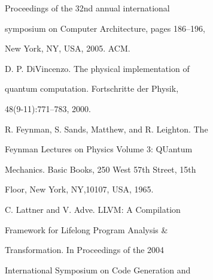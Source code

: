 \documentclass[a4paper,portrait,12pt]{article}
\begin{document}
\begin{flushleft}
Proceedings of the 32nd annual international
\end{flushleft}


\begin{flushleft}
symposium on Computer Architecture, pages 186--196,
\end{flushleft}


\begin{flushleft}
New York, NY, USA, 2005. ACM.
\end{flushleft}


\begin{flushleft}
[2] D. P. DiVincenzo. The physical implementation of
\end{flushleft}


\begin{flushleft}
quantum computation. Fortschritte der Physik,
\end{flushleft}


48(9-11):771--783, 2000.


\begin{flushleft}
[3] R. Feynman, S. Sands, Matthew, and R. Leighton. The
\end{flushleft}


\begin{flushleft}
Feynman Lectures on Physics Volume 3: QUantum
\end{flushleft}


\begin{flushleft}
Mechanics. Basic Books, 250 West 57th Street, 15th
\end{flushleft}


\begin{flushleft}
Floor, New York, NY,10107, USA, 1965.
\end{flushleft}


\begin{flushleft}
[4] C. Lattner and V. Adve. LLVM: A Compilation
\end{flushleft}


\begin{flushleft}
Framework for Lifelong Program Analysis \&
\end{flushleft}


\begin{flushleft}
Transformation. In Proceedings of the 2004
\end{flushleft}


\begin{flushleft}
International Symposium on Code Generation and
\end{flushleft}
\end{document}

